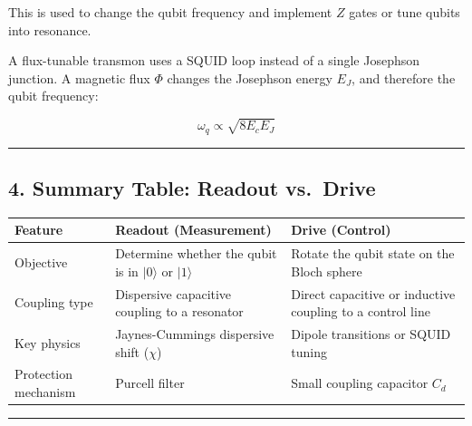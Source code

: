 \documentclass[
]{article}
\begin{document}
This is used to change the qubit frequency and implement \(Z\) gates or
tune qubits into resonance.

A flux-tunable transmon uses a SQUID loop instead of a single Josephson
junction. A magnetic flux \(\Phi\) changes the Josephson energy \(E_J\),
and therefore the qubit frequency:

\[
\omega_q \propto \sqrt{8E_cE_J}
\]

\begin{center}\rule{0.5\linewidth}{0.5pt}\end{center}

\subsection{4. Summary Table: Readout
vs.~Drive}\label{summary-table-readout-vs.-drive}

\begin{longtable}[]{@{}
  >{\raggedright\arraybackslash}p{}
  >{\raggedright\arraybackslash}p{}
  >{\raggedright\arraybackslash}p{}@{}}
\toprule\noalign{}
\begin{minipage}[b]{\linewidth}\raggedright
Feature
\end{minipage} & \begin{minipage}[b]{\linewidth}\raggedright
Readout (Measurement)
\end{minipage} & \begin{minipage}[b]{\linewidth}\raggedright
Drive (Control)
\end{minipage} \\
\midrule\noalign{}
\endhead
\bottomrule\noalign{}
\endlastfoot
Objective & Determine whether the qubit is in \(|0\rangle\) or
\(|1\rangle\) & Rotate the qubit state on the Bloch sphere \\
Coupling type & Dispersive capacitive coupling to a resonator & Direct
capacitive or inductive coupling to a control line \\
Key physics & Jaynes-Cummings dispersive shift (\(\chi\)) & Dipole
transitions or SQUID tuning \\
Protection mechanism & Purcell filter & Small coupling capacitor
\(C_d\) \\
\end{longtable}

\begin{center}\rule{0.5\linewidth}{0.5pt}\end{center}
\end{document}

